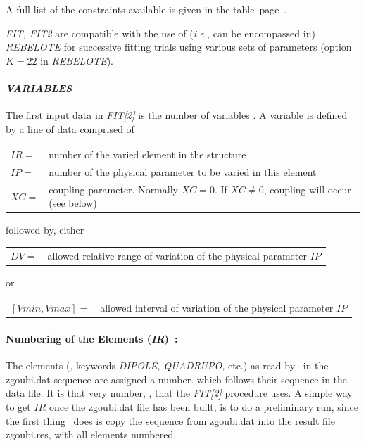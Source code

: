 \medskip

\noindent A full list of the constraints available is given in the table~page~\pageref{TabFITZlst1}. 

\medskip

\noindent \textsl{FIT, FIT2}  are compatible with the use of (\emph{i.e.}, can be encompassed in)  
\textsl{REBELOTE}  for successive fitting  
trials using various sets of parameters (option $K=22$ in \textsl{REBELOTE}). 


\paragraph{\textsl{VARIABLES}}

\noindent The first input data in \textsl{FIT[2]} is the number of variables
\textsl{\NV}. A variable is defined by a line of data comprised of 

\smallskip

\begin{tabular}{ll}
$ IR = $ &number of the varied element in the structure \\
$ IP =  $ &number of the physical parameter to be varied in this element \\
$ XC =  $ &coupling parameter. Normally $ XC=0$.  If $ XC\not= 0$, coupling will occur (see below) \\
\end{tabular} 

\noindent followed by, either 

\begin{tabular}{ll}
$ DV = $ &allowed relative range of variation of the physical parameter $ IP $
\end{tabular}

\noindent or 

\begin{tabular}{ll}
$ [Vmin,Vmax] = $ &allowed interval of variation of the physical parameter $ IP $
\end{tabular}



\paragraph{Numbering of the Elements (\textsl{IR})~: } 

\noindent The elements (\ie, keywords \textsl{DIPOLE, QUADRUPO,} etc.) 
as read by \zgoubi\ in the zgoubi.dat sequence are assigned a number.  which follows 
 their sequence in the  data file.  It  is that very number, \IR, that 
the \textsl{FIT[2]} procedure uses. 
A simple way to get $ IR $ once the zgoubi.dat file has been built, is to do a preliminary run, 
since the first thing  \zgou\ does is 
copy the sequence from zgoubi.dat  into the result file  zgoubi.res,  with all elements numbered.  

